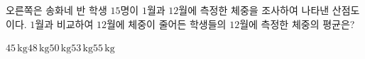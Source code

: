 \noindent\begin{minipage}[t]{0.58\linewidth}\vspace{0pt}\raggedright 오른쪽은 송화네 반 학생 $15$명이 $1$월과 $12$월에 측정한 체중을 조사하여 나타낸 산점도이다. $1$월과 비교하여 $12$월에 체중이 줄어든 학생들의 $12$월에 측정한 체중의 평균은?\end{minipage}\hfill\begin{minipage}[t]{0.4\linewidth}\vspace{0pt}\centering \resizebox{\ifdim\width>\linewidth\linewidth\else\width\fi}{!}{}\end{minipage}\par
\begin{choices32}{$45\,\mathrm{kg}$}{$48\,\mathrm{kg}$}{$50\,\mathrm{kg}$}{$53\,\mathrm{kg}$}{$55\,\mathrm{kg}$}\end{choices32}
